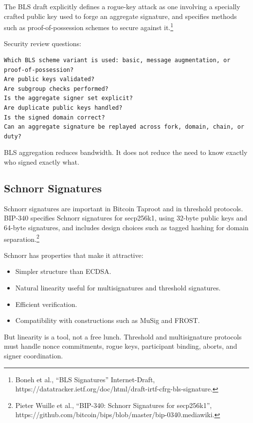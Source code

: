 The BLS draft explicitly defines a rogue-key attack as one involving a
specially crafted public key used to forge an aggregate signature, and
specifies methods such as proof-of-possession schemes to secure against
it.\footnote{Boneh et al., ``BLS Signatures'' Internet-Draft,
  https://datatracker.ietf.org/doc/html/draft-irtf-cfrg-bls-signature.}

Security review questions:

\begin{lstlisting}
Which BLS scheme variant is used: basic, message augmentation, or proof-of-possession?
Are public keys validated?
Are subgroup checks performed?
Is the aggregate signer set explicit?
Are duplicate public keys handled?
Is the signed domain correct?
Can an aggregate signature be replayed across fork, domain, chain, or duty?
\end{lstlisting}

BLS aggregation reduces bandwidth. It does not reduce the need to know
exactly who signed exactly what.

\subsection{Schnorr Signatures}

Schnorr signatures are important in Bitcoin Taproot and in threshold
protocols. BIP-340 specifies Schnorr signatures for secp256k1, using
32-byte public keys and 64-byte signatures, and includes design choices
such as tagged hashing for domain separation.\footnote{Pieter Wuille et
  al., ``BIP-340: Schnorr Signatures for secp256k1'',
  https://github.com/bitcoin/bips/blob/master/bip-0340.mediawiki.}

Schnorr has properties that make it attractive:

\begin{itemize}
\tightlist
\item
  Simpler structure than ECDSA.
\item
  Natural linearity useful for multisignatures and threshold signatures.
\item
  Efficient verification.
\item
  Compatibility with constructions such as MuSig and FROST.
\end{itemize}

But linearity is a tool, not a free lunch. Threshold and multisignature
protocols must handle nonce commitments, rogue keys, participant
binding, aborts, and signer coordination.

